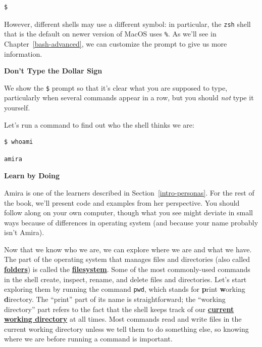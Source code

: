 \documentclass[
]{krantz}
\renewenvironment{quote}{\begin{VF}}{\end{VF}}
\newcommand{\gref}[2]{\hyperlink{#2}{\textbf{#1}}}
\begin{document}
\begin{verbatim}
$
\end{verbatim}

However,
different shells may use a different symbol:
in particular,
the \texttt{zsh} shell that is the default on newer version of MacOS uses \texttt{\%}.
As we'll see in Chapter~\ref{bash-advanced},
we can customize the prompt to give us more information.

\begin{quote}
\textbf{Don't Type the Dollar Sign}

We show the \texttt{\$} prompt so that it's clear what you are supposed to type,
particularly when several commands appear in a row,
but you should \emph{not} type it yourself.
\end{quote}

Let's run a command to find out who the shell thinks we are:

\begin{verbatim}
$ whoami
\end{verbatim}

\begin{verbatim}
amira
\end{verbatim}

\begin{quote}
\textbf{Learn by Doing}

Amira is one of the learners described in Section~\ref{intro-personas}.
For the rest of the book,
we'll present code and examples from her perspective.
You should follow along on your own computer,
though what you see might deviate in small ways because of differences in operating system
(and because your name probably isn't Amira).
\end{quote}

Now that we know who we are,
we can explore where we are and what we have.
The part of the operating system that manages files and directories (also called \gref{folders}{folder})
is called the \gref{filesystem}{filesystem}.
Some of the most commonly-used commands in the shell create, inspect, rename, and delete files and directories.
Let's start exploring them by running the command \texttt{pwd},
which stands for \textbf{p}rint \textbf{w}orking \textbf{d}irectory.
The ``print'' part of its name is straightforward;
the ``working directory'' part refers to the fact that
the shell keeps track of our \gref{current working directory}{current\_working\_directory} at all times.
Most commands read and write files in the current working directory
unless we tell them to do something else,
so knowing where we are before running a command is important.
\end{document}
